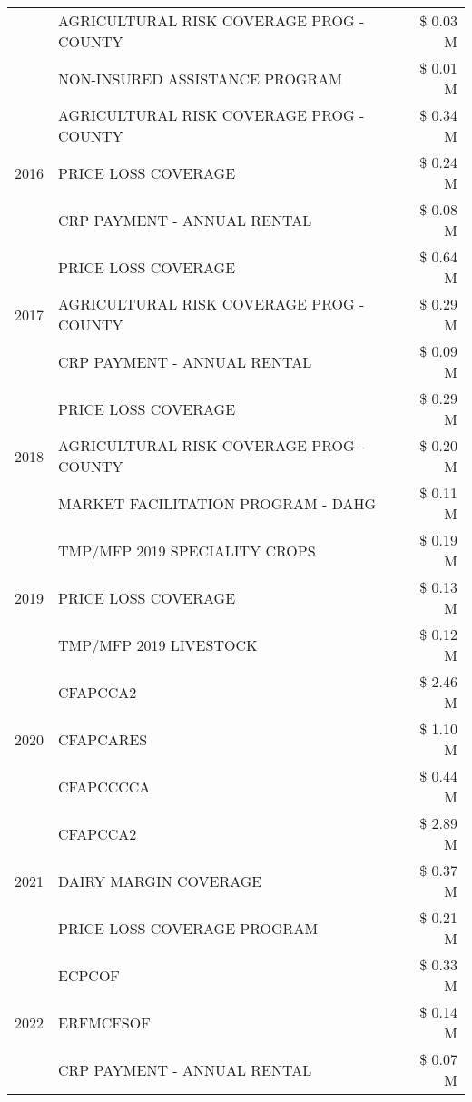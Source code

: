 \begin{tabular}{llr}
 & AGRICULTURAL RISK COVERAGE PROG - COUNTY & \$ 0.03 M \\
 & NON-INSURED ASSISTANCE PROGRAM & \$ 0.01 M \\
\cline{1-3}
\multirow[t]{3}{*}{2016} & AGRICULTURAL RISK COVERAGE PROG - COUNTY & \$ 0.34 M \\
 & PRICE LOSS COVERAGE & \$ 0.24 M \\
 & CRP PAYMENT - ANNUAL RENTAL & \$ 0.08 M \\
\cline{1-3}
\multirow[t]{3}{*}{2017} & PRICE LOSS COVERAGE & \$ 0.64 M \\
 & AGRICULTURAL RISK COVERAGE PROG - COUNTY & \$ 0.29 M \\
 & CRP PAYMENT - ANNUAL RENTAL & \$ 0.09 M \\
\cline{1-3}
\multirow[t]{3}{*}{2018} & PRICE LOSS COVERAGE & \$ 0.29 M \\
 & AGRICULTURAL RISK COVERAGE PROG - COUNTY & \$ 0.20 M \\
 & MARKET FACILITATION PROGRAM - DAHG & \$ 0.11 M \\
\cline{1-3}
\multirow[t]{3}{*}{2019} & TMP/MFP 2019 SPECIALITY CROPS & \$ 0.19 M \\
 & PRICE LOSS COVERAGE & \$ 0.13 M \\
 & TMP/MFP 2019 LIVESTOCK & \$ 0.12 M \\
\cline{1-3}
\multirow[t]{3}{*}{2020} & CFAPCCA2 & \$ 2.46 M \\
 & CFAPCARES & \$ 1.10 M \\
 & CFAPCCCCA & \$ 0.44 M \\
\cline{1-3}
\multirow[t]{3}{*}{2021} & CFAPCCA2 & \$ 2.89 M \\
 & DAIRY MARGIN COVERAGE & \$ 0.37 M \\
 & PRICE LOSS COVERAGE PROGRAM & \$ 0.21 M \\
\cline{1-3}
\multirow[t]{3}{*}{2022} & ECPCOF & \$ 0.33 M \\
 & ERFMCFSOF & \$ 0.14 M \\
 & CRP PAYMENT - ANNUAL RENTAL & \$ 0.07 M \\
\cline{1-3}
\bottomrule
\end{tabular}
